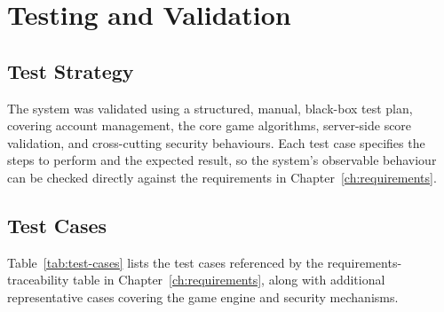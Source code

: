 \chapter{Testing and Validation}
\label{ch:testing}

\section{Test Strategy}
The system was validated using a structured, manual, black-box test plan,
covering account management, the core game algorithms, server-side score
validation, and cross-cutting security behaviours. Each test case specifies
the steps to perform and the expected result, so the system's observable
behaviour can be checked directly against the requirements in
Chapter~\ref{ch:requirements}.

\section{Test Cases}
Table~\ref{tab:test-cases} lists the test cases referenced by the
requirements-traceability table in Chapter~\ref{ch:requirements}, along with
additional representative cases covering the game engine and security
mechanisms.

